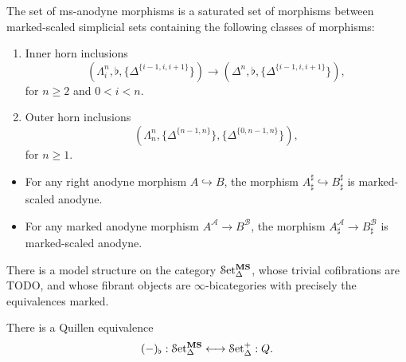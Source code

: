 \documentclass[main.tex]{subfiles}
\begin{document}
\begin{definition}
  \label{def:ms-anodyne_morphisms}
  The set of ms-anodyne morphisms is a saturated set of morphisms between marked-scaled simplicial sets containing the following classes of morphisms:
  \begin{enumerate}[label=(A\arabic*)]
    \item\label{item:innerms} Inner horn inclusions
      \begin{equation*}
        (\Lambda^{n}_{i}, \flat, \{\Delta^{\{i-1,i,i+1\}}\}) \to (\Delta^{n}, \flat, \{\Delta^{\{i-1,i,i+1\}}\}),
      \end{equation*}
      for $n \geq 2$ and $0 < i < n$.

    \item\label{item:outerms} Outer horn inclusions
      \begin{equation*}
        (\Lambda^{n}_{n}, \{\Delta^{\{n-1,n\}}\}, \{\Delta^{\{0, n-1, n\}}\}),
      \end{equation*}
      for $n \geq 1$.
  \end{enumerate}
\end{definition}

\begin{example}
  \label{prop:sharp_marked_right_anodyne}
  \leavevmode
  \begin{itemize}
    \item For any right anodyne morphism $A \hookrightarrow B$, the morphism $A^{\sharp}_{\sharp} \hookrightarrow B^{\sharp}_{\sharp}$ is marked-scaled anodyne.

    \item For any marked anodyne morphism $A^{\mathcal{A}} \to B^{\mathcal{B}}$, the morphism $A^{\mathcal{A}}_{\sharp} \to B^{\mathcal{B}}_{\sharp}$ is marked-scaled anodyne.
  \end{itemize}
\end{example}

\begin{theorem}
  There is a model structure on the category $\mathcal{S}\mathrm{et}_{\Delta}^{\mathbf{MS}}$, whose trivial cofibrations are TODO, and whose fibrant objects are $\infty$-bicategories with precisely the equivalences marked.
\end{theorem}

\begin{theorem}
  \label{thm:quillen_equiv_ms_and_scaled}
  There is a Quillen equivalence
  \begin{equation*}
    (-)_{\flat} : \mathcal{S}\mathrm{et}_{\Delta}^{\mathbf{MS}} \longleftrightarrow \mathcal{S}\mathrm{et}_{\Delta}^{+} : Q.
  \end{equation*}
\end{theorem}
\end{document}

